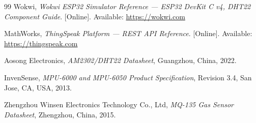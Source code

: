 \documentclass[12pt, a4paper]{article}
\begin{document}
\begin{thebibliography}{99}
Wokwi, \textit{Wokwi ESP32 Simulator Reference --- ESP32 DevKit C v4, DHT22 Component Guide}. [Online]. Available: \url{https://wokwi.com}

MathWorks, \textit{ThingSpeak Platform --- REST API Reference}. [Online]. Available: \url{https://thingspeak.com}

Aosong Electronics, \textit{AM2302/DHT22 Datasheet}, Guangzhou, China, 2022.

InvenSense, \textit{MPU-6000 and MPU-6050 Product Specification}, Revision 3.4, San Jose, CA, USA, 2013.

Zhengzhou Winsen Electronics Technology Co., Ltd, \textit{MQ-135 Gas Sensor Datasheet}, Zhengzhou, China, 2015.

\end{thebibliography}
\end{document}
